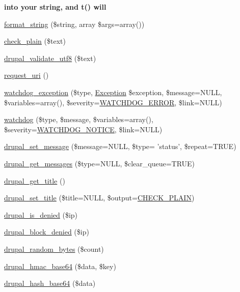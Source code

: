 \begin{Indent}{\bf into your string, and t() will}
\begin{DoxyCompactItemize}
\item 
\hyperlink{group__sanitization_ga8da272cf93fb6ba229eca7c0b06ea4d2}{format\_\-string} (\$string, array \$args=array())
\item 
\hyperlink{group__sanitization_ga76fc67a30fd8d75ddd80565e6e65a13d}{check\_\-plain} (\$text)
\item 
\hyperlink{bootstrap_8inc_abf62947a33393477301b0070b1ff0c7a}{drupal\_\-validate\_\-utf8} (\$text)
\item 
\hyperlink{bootstrap_8inc_a80b52d5331d840440b5e3dfe82dd7ea2}{request\_\-uri} ()
\item 
\hyperlink{bootstrap_8inc_aba38f35647efce6b4099dc59131e216b}{watchdog\_\-exception} (\$type, \hyperlink{classException}{Exception} \$exception, \$message=NULL, \$variables=array(), \$severity=\hyperlink{group__logging__severity__levels_ga174c9df2936096e11986fcf184d48576}{WATCHDOG\_\-ERROR}, \$link=NULL)
\item 
\hyperlink{bootstrap_8inc_acb7338e6740302727043d64e3ae1257b}{watchdog} (\$type, \$message, \$variables=array(), \$severity=\hyperlink{group__logging__severity__levels_ga757a33416683e8c44636a8799f60b477}{WATCHDOG\_\-NOTICE}, \$link=NULL)
\item 
\hyperlink{bootstrap_8inc_ad9223d86c7b08b1288274ce211d9bfa6}{drupal\_\-set\_\-message} (\$message=NULL, \$type= 'status', \$repeat=TRUE)
\item 
\hyperlink{bootstrap_8inc_a2c9915d030bad8c5bacf6de25e6fd14c}{drupal\_\-get\_\-messages} (\$type=NULL, \$clear\_\-queue=TRUE)
\item 
\hyperlink{bootstrap_8inc_a88f660bf675e572de22a8469841bbd08}{drupal\_\-get\_\-title} ()
\item 
\hyperlink{bootstrap_8inc_a1994d49eb621df71fe1306e13b7e4910}{drupal\_\-set\_\-title} (\$title=NULL, \$output=\hyperlink{bootstrap_8inc_a7b115778ff532867b7af4c53d39a1de2}{CHECK\_\-PLAIN})
\item 
\hyperlink{bootstrap_8inc_ad5f73157a9aa67bd49759636f00fee8a}{drupal\_\-is\_\-denied} (\$ip)
\item 
\hyperlink{bootstrap_8inc_a82de27d521020862a868f567d6bd7dea}{drupal\_\-block\_\-denied} (\$ip)
\item 
\hyperlink{bootstrap_8inc_a6eb7796c83ea744f818faa2a02f19953}{drupal\_\-random\_\-bytes} (\$count)
\item 
\hyperlink{bootstrap_8inc_a677ac93b9fcba24a3ffeb02e08ca8e9a}{drupal\_\-hmac\_\-base64} (\$data, \$key)
\item 
\hyperlink{bootstrap_8inc_afaa1b21aee7b2e06ee3f868065fdbcc1}{drupal\_\-hash\_\-base64} (\$data)

\end{DoxyCompactItemize}
\end{Indent}
